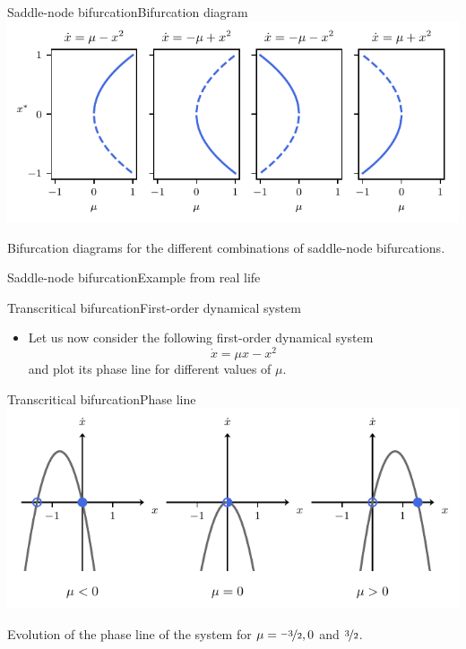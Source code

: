 \documentclass[usenames,dvipsnames,svgnames,10pt,aspectratio=169]{beamer}
\begin{document}
\begin{frame}[t, c]{Saddle-node bifurcation}{Bifurcation diagram}
	\centering
	\includegraphics[width=.75\textwidth]{saddle_node_bifurcation_diagrams}

	Bifurcation diagrams for the different combinations of saddle-node bifurcations.
	\vspace{1cm}
\end{frame}

\begin{frame}[t, c]{Saddle-node bifurcation}{Example from real life}

\end{frame}

\begin{frame}[t, c]{Transcritical bifurcation}{First-order dynamical system}
	\begin{itemize}
		\item Let us now consider the following first-order dynamical system
		$$\dot{x} = \mu x - x^2$$
		and plot its phase line for different values of $\mu$.
	\end{itemize}

	\vspace{1cm}
\end{frame}

\begin{frame}[t, c]{Transcritical bifurcation}{Phase line}
	\centering
	\includegraphics[width=.75\textwidth]{transcritical_phase_line}

	Evolution of the phase line of the system for $\mu = \nicefrac{-3}{2}, 0$ and $\nicefrac{3}{2}$.

	\vspace{1cm}
\end{frame}
\end{document}
